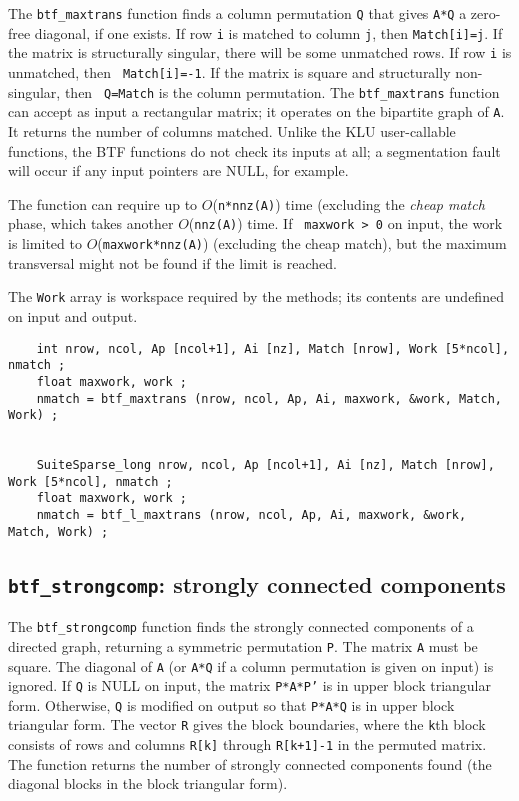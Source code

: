 \documentclass[11pt]{article}
\begin{document}
The {\tt btf\_maxtrans} function finds a column permutation {\tt Q} that gives
{\tt A*Q} a zero-free diagonal, if one exists.  If row {\tt i} is matched to
column {\tt j}, then {\tt Match[i]=j}.  If the matrix is structurally singular,
there will be some unmatched rows.  If row {\tt i} is unmatched, then {\tt
Match[i]=-1}.  If the matrix is square and structurally non-singular, then {\tt
Q=Match} is the column permutation.  The {\tt btf\_maxtrans} function can
accept as input a rectangular matrix; it operates on the bipartite graph of
{\tt A}.  It returns the number of columns matched.  Unlike the KLU
user-callable functions, the BTF functions do not check its inputs at all; a
segmentation fault will occur if any input pointers are NULL, for example.

The function can require up to $O$({\tt n*nnz(A)}) time (excluding the {\em
cheap match} phase, which takes another $O$({\tt nnz(A)}) time.  If {\tt
maxwork > 0} on input, the work is limited to $O$({\tt maxwork*nnz(A)})
(excluding the cheap match), but the maximum transversal might not be found if
the limit is reached.

The {\tt Work} array is workspace required by the methods; its contents
are undefined on input and output.

{\footnotesize
\begin{verbatim}
    int nrow, ncol, Ap [ncol+1], Ai [nz], Match [nrow], Work [5*ncol], nmatch ;
    float maxwork, work ;
    nmatch = btf_maxtrans (nrow, ncol, Ap, Ai, maxwork, &work, Match, Work) ;


    SuiteSparse_long nrow, ncol, Ap [ncol+1], Ai [nz], Match [nrow], Work [5*ncol], nmatch ;
    float maxwork, work ;
    nmatch = btf_l_maxtrans (nrow, ncol, Ap, Ai, maxwork, &work, Match, Work) ;
\end{verbatim}
}

\subsection{{\tt btf\_strongcomp}: strongly connected components}

The {\tt btf\_strongcomp} function finds the strongly connected components of a
directed graph, returning a symmetric permutation {\tt P}.  The matrix {\tt A}
must be square.  The diagonal of {\tt A} (or {\tt A*Q} if a column permutation
is given on input) is ignored.  If {\tt Q} is NULL on input, the matrix
{\tt P*A*P'} is in upper block triangular form.  Otherwise, {\tt Q} is modified
on output so that {\tt P*A*Q} is in upper block triangular form.  The vector
{\tt R} gives the block boundaries, where the {\tt k}th block consists of
rows and columns {\tt R[k]} through {\tt R[k+1]-1} in the permuted matrix.
The function returns the number of strongly connected components found
(the diagonal blocks in the block triangular form).
\end{document}
